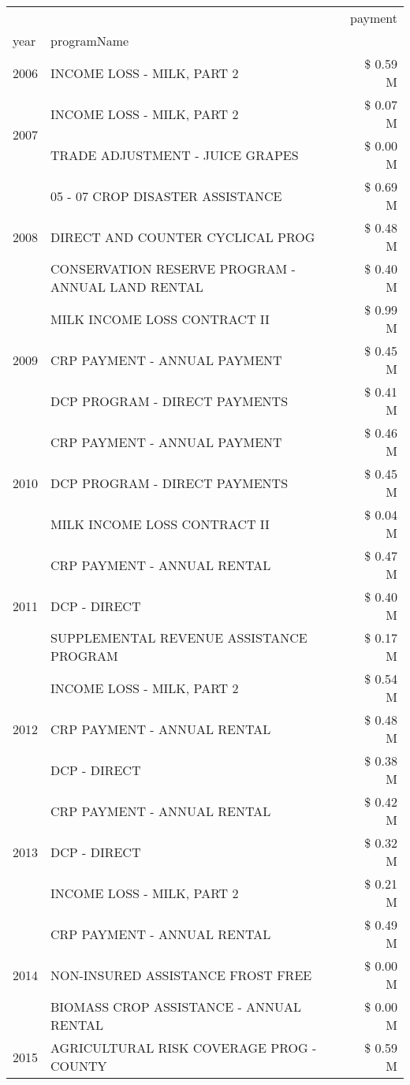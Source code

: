 \begin{tabular}{llr}
\toprule
 &  & payment \\
year & programName &  \\
\midrule
2006 & INCOME LOSS - MILK, PART 2 & \$ 0.59 M \\
\cline{1-3}
\multirow[t]{2}{*}{2007} & INCOME LOSS - MILK, PART 2 & \$ 0.07 M \\
 & TRADE ADJUSTMENT - JUICE GRAPES & \$ 0.00 M \\
\cline{1-3}
\multirow[t]{3}{*}{2008} & 05 - 07 CROP DISASTER ASSISTANCE & \$ 0.69 M \\
 & DIRECT AND COUNTER CYCLICAL PROG & \$ 0.48 M \\
 & CONSERVATION RESERVE PROGRAM - ANNUAL LAND RENTAL & \$ 0.40 M \\
\cline{1-3}
\multirow[t]{3}{*}{2009} & MILK INCOME LOSS CONTRACT II & \$ 0.99 M \\
 & CRP PAYMENT - ANNUAL PAYMENT & \$ 0.45 M \\
 & DCP PROGRAM - DIRECT PAYMENTS & \$ 0.41 M \\
\cline{1-3}
\multirow[t]{3}{*}{2010} & CRP PAYMENT - ANNUAL PAYMENT & \$ 0.46 M \\
 & DCP PROGRAM - DIRECT PAYMENTS & \$ 0.45 M \\
 & MILK INCOME LOSS CONTRACT II & \$ 0.04 M \\
\cline{1-3}
\multirow[t]{3}{*}{2011} & CRP PAYMENT - ANNUAL RENTAL & \$ 0.47 M \\
 & DCP - DIRECT & \$ 0.40 M \\
 & SUPPLEMENTAL REVENUE ASSISTANCE PROGRAM & \$ 0.17 M \\
\cline{1-3}
\multirow[t]{3}{*}{2012} & INCOME LOSS - MILK, PART 2 & \$ 0.54 M \\
 & CRP PAYMENT - ANNUAL RENTAL & \$ 0.48 M \\
 & DCP - DIRECT & \$ 0.38 M \\
\cline{1-3}
\multirow[t]{3}{*}{2013} & CRP PAYMENT - ANNUAL RENTAL & \$ 0.42 M \\
 & DCP - DIRECT & \$ 0.32 M \\
 & INCOME LOSS - MILK, PART 2 & \$ 0.21 M \\
\cline{1-3}
\multirow[t]{3}{*}{2014} & CRP PAYMENT - ANNUAL RENTAL & \$ 0.49 M \\
 & NON-INSURED ASSISTANCE FROST FREE & \$ 0.00 M \\
 & BIOMASS CROP ASSISTANCE - ANNUAL RENTAL & \$ 0.00 M \\
\cline{1-3}
\multirow[t]{3}{*}{2015} & AGRICULTURAL RISK COVERAGE PROG - COUNTY & \$ 0.59 M \\

\end{tabular}
